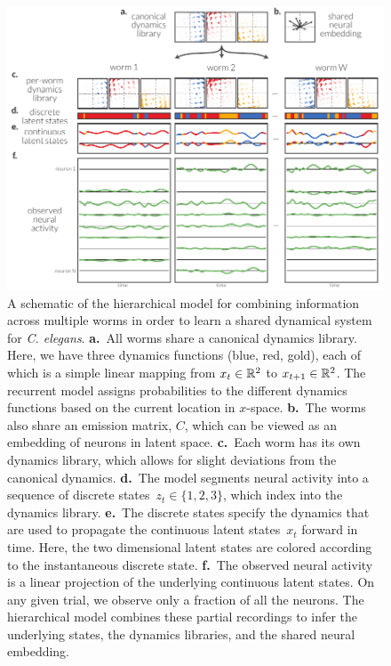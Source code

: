 \documentclass[11pt]{article}
\newcommand{\celegans}{\textit{C. elegans}}
\begin{document}
\begin{figure}[t]
\centering%
\includegraphics[width=6in]{figures/figure1} 
\caption{A schematic of the hierarchical model for combining
  information across multiple worms in order to learn a shared
  dynamical system for \celegans.  \textbf{a.}~All worms share a
  canonical dynamics library. Here, we have three dynamics functions
  (blue, red, gold), each of which is a simple linear mapping from
  $x_t \in \mathbb{R}^2$ to $x_{t+1} \in \mathbb{R}^2$.  The recurrent model
  assigns probabilities to the different dynamics functions based on
  the current location in $x$-space.  \textbf{b.}~The worms also share
  an emission matrix, $C$, which can be viewed as an embedding of
  neurons in latent space.  \textbf{c.}~Each worm has its own dynamics
  library, which allows for slight deviations from the canonical
  dynamics.  \textbf{d.}~The model segments neural activity into a
  sequence of discrete states~$z_{t} \in \{1, 2, 3\}$, which index
  into the dynamics library.  \textbf{e.}~The discrete states specify
  the dynamics that are used to propagate the continuous latent
  states~$x_t$ forward in time. Here, the two dimensional latent
  states are colored according to the instantaneous discrete
  state. \textbf{f.}~The observed neural activity is a linear
  projection of the underlying continuous latent states.  On any given
  trial, we observe only a fraction of all the neurons.  The
  hierarchical model combines these partial recordings to infer the
  underlying states, the dynamics libraries, and the shared neural
  embedding. }
\label{fig:model}
\end{figure}
\end{document}
